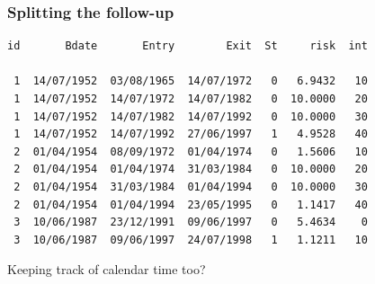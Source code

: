 \begin{frame}[fragile]
  \frametitle{Splitting the follow-up}
{\footnotesize
\renewcommand{\baselinestretch}{0.8}
\begin{verbatim}
id       Bdate       Entry        Exit  St     risk  int

 1  14/07/1952  03/08/1965  14/07/1972   0   6.9432   10
 1  14/07/1952  14/07/1972  14/07/1982   0  10.0000   20
 1  14/07/1952  14/07/1982  14/07/1992   0  10.0000   30
 1  14/07/1952  14/07/1992  27/06/1997   1   4.9528   40
 2  01/04/1954  08/09/1972  01/04/1974   0   1.5606   10
 2  01/04/1954  01/04/1974  31/03/1984   0  10.0000   20
 2  01/04/1954  31/03/1984  01/04/1994   0  10.0000   30
 2  01/04/1954  01/04/1994  23/05/1995   0   1.1417   40
 3  10/06/1987  23/12/1991  09/06/1997   0   5.4634    0
 3  10/06/1987  09/06/1997  24/07/1998   1   1.1211   10
\end{verbatim}
\renewcommand{\baselinestretch}{1.0}
}
 Keeping track of calendar time too?

\end{frame}



